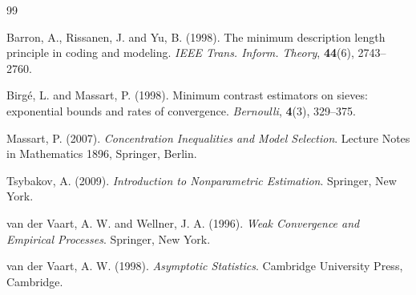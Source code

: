 \documentclass[12pt]{article}
\numberwithin{equation}{section}
\begin{document}
	\begin{thebibliography}{99}
		
		Barron, A., Rissanen, J. and Yu, B. (1998).
		The minimum description length principle in coding and modeling.
		\emph{IEEE Trans. Inform. Theory}, \textbf{44}(6), 2743--2760.

		Birg\'e, L. and Massart, P. (1998).
		Minimum contrast estimators on sieves: exponential bounds and rates of
		convergence. \emph{Bernoulli}, \textbf{4}(3), 329--375.

		Massart, P. (2007).
		\emph{Concentration Inequalities and Model Selection}.
		Lecture Notes in Mathematics 1896, Springer, Berlin.
		
		Tsybakov, A. (2009).
		\emph{Introduction to Nonparametric Estimation}.
		Springer, New York.
		
		van der Vaart, A. W. and Wellner, J. A. (1996).
		\emph{Weak Convergence and Empirical Processes}.
		Springer, New York.
		
		van der Vaart, A. W. (1998).
		\emph{Asymptotic Statistics}.
		Cambridge University Press, Cambridge.
		
	\end{thebibliography}
	
\end{document}
